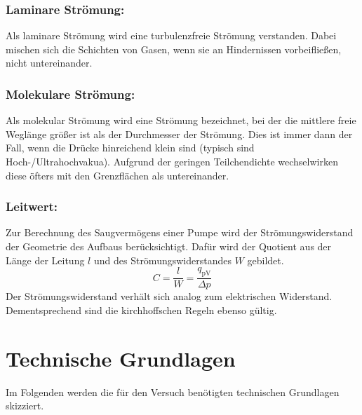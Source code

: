 \subsubsection{Laminare Strömung:}
Als laminare Strömung wird eine turbulenzfreie Strömung verstanden. Dabei mischen sich die Schichten von Gasen, wenn sie an Hindernissen vorbeifließen, nicht untereinander.

\subsubsection{Molekulare Strömung:}
Als molekular Strömung wird eine Strömung bezeichnet, bei der die mittlere freie Weglänge größer ist als der Durchmesser der Strömung. Dies ist immer dann der Fall, wenn die Drücke hinreichend klein sind (typisch sind Hoch-/Ultrahochvakua). Aufgrund der geringen Teilchendichte wechselwirken diese öfters mit den Grenzflächen als untereinander.

\subsubsection{Leitwert:}
Zur Berechnung des Saugvermögens einer Pumpe wird der Strömungswiderstand der Geometrie des Aufbaus berücksichtigt. Dafür wird der Quotient aus der Länge der Leitung $l$ und des Strömungswiderstandes $W$ gebildet.
\begin{equation}
  C = \frac{l}{W} = \frac{q_\text{pV}}{\Delta p}
\end{equation}
Der Strömungswiderstand verhält sich analog zum elektrischen Widerstand. Dementsprechend sind die kirchhoffschen Regeln ebenso gültig.

\section{Technische Grundlagen}
Im Folgenden werden die für den Versuch benötigten technischen Grundlagen skizziert.
